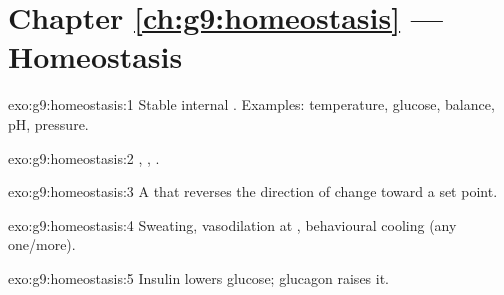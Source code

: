 \section*{Chapter \ref{ch:g9:homeostasis} --- Homeostasis}

\begin{solution}{exo:g9:homeostasis:1}
Stable internal . Examples: temperature,  glucose, 
balance, pH,  pressure.
\end{solution}

\begin{solution}{exo:g9:homeostasis:2}
, , .
\end{solution}

\begin{solution}{exo:g9:homeostasis:3}
A  that reverses the direction of change toward a set point.
\end{solution}

\begin{solution}{exo:g9:homeostasis:4}
Sweating, vasodilation at , behavioural cooling (any one/more).
\end{solution}

\begin{solution}{exo:g9:homeostasis:5}
Insulin lowers  glucose; glucagon raises it.
\end{solution}

